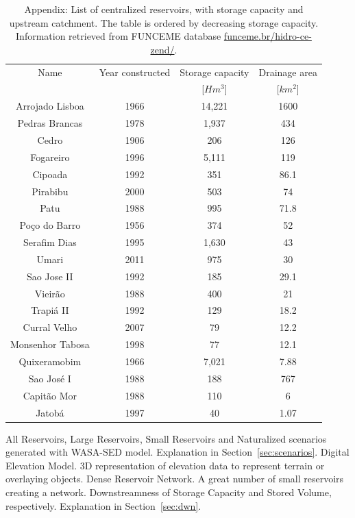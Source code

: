 \documentclass[draft]{agujournal2019}
\begin{document}
\begin{table}
 \caption{Appendix: List of centralized reservoirs, with storage capacity and upstream catchment. The table is ordered by decreasing storage capacity. Information retrieved from FUNCEME database \url{funceme.br/hidro-ce-zend/}.}\label{tabA}
 \centering
 \begin{tabular}{c c c c}
 \hline
  Name  & Year constructed & Storage capacity & Drainage area\\
  & & [$Hm^3$] & [$km^2$]\\
 \hline
Arrojado Lisboa 	& 1966 &	 14,221	& 1600\\
Pedras Brancas	& 1978	& 1,937 &	434\\
Cedro			& 1906	& 206 &	126\\
Fogareiro 		& 1996	 & 5,111 & 	119\\
Cipoada			& 1992	& 351 &	86.1\\
Pirabibu			& 2000	& 503	& 74\\
Patu	 			& 1988	& 995	& 71.8\\
Poço do Barro	& 1956	 & 374 & 52\\
Serafim Dias 	& 1995 &	1,630 &	43\\
Umari			& 2011	& 975	& 30\\
Sao Jose II		& 1992	& 185	& 29.1\\
Vieirão			& 1988	& 400 &	21\\
Trapiá II 		& 1992 & 	129 &	18.2\\
Curral Velho	 	& 2007 & 	79 & 	12.2\\
Monsenhor Tabosa & 1998 & 77 &	12.1\\
Quixeramobim 	& 1966 & 7,021 &	7.88\\
Sao José I		& 1988 & 	188 & 	767\\
Capitão Mor		& 1988	& 110 &	6\\
Jatobá 			& 1997 &	40	& 1.07\\
 \hline
 \end{tabular}
\end{table}

%

   \begin{acronyms}
   All Reservoirs, Large Reservoirs, Small Reservoirs and Naturalized scenarios generated with WASA-SED model. Explanation in Section~\ref{sec:scenarios}.
   Digital Elevation Model. 3D representation of elevation data to represent terrain or overlaying objects.
   Dense Reservoir Network. A great number of small reservoirs creating a network.
   Downstreamness of Storage Capacity and Stored Volume, respectively. Explanation in Section~\ref{sec:dwn}.
   \end{acronyms}
\end{document}
